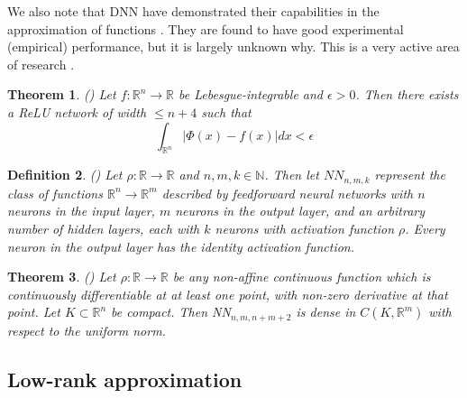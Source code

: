 \documentclass{article}
\newtheorem{theorem}{Theorem}
\newtheorem{definition}[theorem]{Definition}
\begin{document}
We also note that DNN have demonstrated their capabilities in the approximation of functions \citep{liang2016deep,yarotsky2017error,fan2020universal}. They are found to have good experimental (empirical) performance, but it is largely unknown why. This is a very active area of research \cite{caterini2018deep}.

\begin{theorem}
(\cite{lu2017expressive}) Let  $f:\mathbb{R}^{n}\rightarrow\mathbb{R}$ be Lebesgue-integrable and $\epsilon>0$. Then there exists a ReLU
network of width $\leq n+4$ such that
\[
\int_{\mathbb{R}^{n}}\left\vert \Phi\left(  x\right)  -f\left(  x\right)  \right\vert dx<\epsilon
\]

\end{theorem}

\begin{definition}
(\cite{kidger2020universal}) Let $\rho:\mathbb{R}\rightarrow\mathbb{R}$ and $n,m,k\in\mathbb{N}$. Then let $NN_{n,m,k}$ represent the class of functions $\mathbb{R}^{n}\rightarrow\mathbb{R}^{m}$ described by feedforward neural networks with $n$ neurons in the input layer, $m$ neurons in the output layer, and an arbitrary number of hidden layers, each with $k$ neurons with activation function $\rho$. Every neuron in the output layer has the identity activation function.
\end{definition}

\begin{theorem}
(\cite{kidger2020universal}) Let $\rho:\mathbb{R}\rightarrow\mathbb{R}$ be any non-affine continuous function which is continuously differentiable at
at least one point, with non-zero derivative at that point. Let $K\subset\mathbb{R}^{n}$ be compact. Then NN$_{n,m,n+m+2}$ is dense in $C\left(  K,\mathbb{R}^{m}\right)$ with respect to the uniform norm.
\end{theorem}


\subsection{Low-rank approximation}
\end{document}
